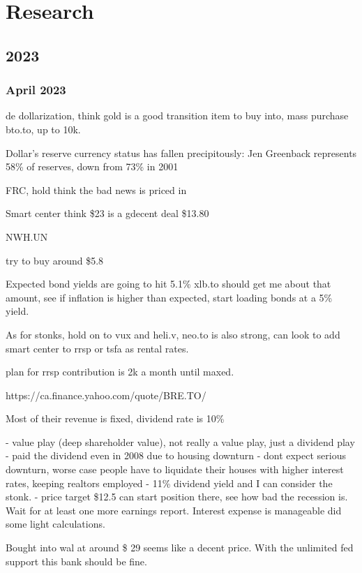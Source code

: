 \chapter{Research}


\section{2023}

\subsection{April 2023}

de dollarization,   think gold is a good transition item to buy into, mass purchase bto.to, up to 10k.

Dollar’s reserve currency status has fallen precipitously: Jen
Greenback represents 58\% of reserves, down from 73\% in 2001


FRC, hold think the bad news is priced in

Smart center think \$23 is a gdecent deal
\$13.80

NWH.UN

try to buy around \$5.8

Expected bond yields are going to hit 5.1\%  xlb.to should get me about that amount, see if inflation is higher than expected, start loading bonds at a 5\% yield.

As for stonks, hold on to vux and heli.v, neo.to is also strong, can look to add smart center to rrsp or tsfa as rental rates.

plan for rrsp contribution is 2k a month until maxed.

https://ca.finance.yahoo.com/quote/BRE.TO/

Most of their revenue is fixed, dividend rate is 10\%

- value play (deep shareholder value), not really a value play, just a dividend play
- paid the dividend even in 2008 due to housing downturn
- dont expect serious downturn, worse case people have to liquidate their houses with higher interest rates, keeping realtors employed
- 11\% dividend yield and I can consider the stonk.
- price target \$12.5 can start position there, see how bad the recession is. Wait for at least one more earnings report. Interest expense is manageable did some light calculations.

Bought into wal at around \$ 29 seems like a decent price. With the unlimited fed support this bank should be fine.


